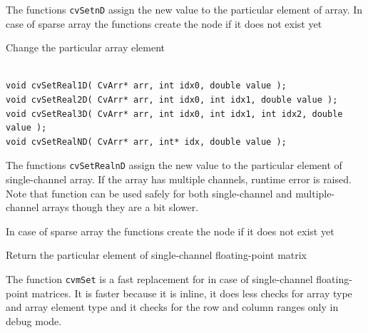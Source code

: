 The functions \texttt{cvSetnD} assign the new value to the particular element of array. In case of sparse array the functions create the node if it does not exist yet

\label{SetRealnD}

Change the particular array element

\begin{lstlisting}

void cvSetReal1D( CvArr* arr, int idx0, double value );
void cvSetReal2D( CvArr* arr, int idx0, int idx1, double value );
void cvSetReal3D( CvArr* arr, int idx0, int idx1, int idx2, double value );
void cvSetRealND( CvArr* arr, int* idx, double value );

\end{lstlisting}

\begin{description}
\end{description}

The functions \texttt{cvSetRealnD} assign the new value to the particular
element of single-channel array. If the array has multiple channels,
runtime error is raised. Note that  function can be used
safely for both single-channel and multiple-channel arrays though they
are a bit slower.

In case of sparse array the functions create the node if it does not exist yet

\label{mSet}

Return the particular element of single-channel floating-point matrix


\begin{description}
\end{description}


The function \texttt{cvmSet} is a fast replacement for 
in case of single-channel floating-point matrices. It is faster because
it is inline, it does less checks for array type and array element type
and it checks for the row and column ranges only in debug mode.

